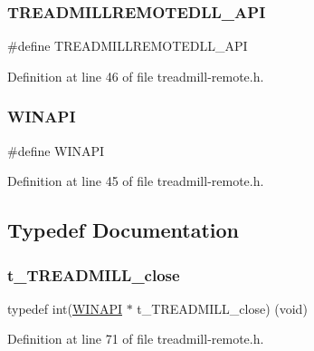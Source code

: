 \subsubsection{\texorpdfstring{T\+R\+E\+A\+D\+M\+I\+L\+L\+R\+E\+M\+O\+T\+E\+D\+L\+L\+\_\+\+A\+PI}{TREADMILLREMOTEDLL\_API}}
{\footnotesize\ttfamily \#define T\+R\+E\+A\+D\+M\+I\+L\+L\+R\+E\+M\+O\+T\+E\+D\+L\+L\+\_\+\+A\+PI}



Definition at line 46 of file treadmill-\/remote.\+h.

\mbox{\label{treadmill-remote_8h_a9aa60e1ead64be77ad551e745cbfd4d3}} 
\subsubsection{\texorpdfstring{W\+I\+N\+A\+PI}{WINAPI}}
{\footnotesize\ttfamily \#define W\+I\+N\+A\+PI}



Definition at line 45 of file treadmill-\/remote.\+h.



\subsection{Typedef Documentation}
\mbox{\label{treadmill-remote_8h_a43fd64b472e18efee7fddae738cf3b3c}} 
\subsubsection{\texorpdfstring{t\+\_\+\+T\+R\+E\+A\+D\+M\+I\+L\+L\+\_\+close}{t\_TREADMILL\_close}}
{\footnotesize\ttfamily typedef int(\hyperlink{treadmill-remote_8h_a9aa60e1ead64be77ad551e745cbfd4d3}{W\+I\+N\+A\+PI} $\ast$ t\+\_\+\+T\+R\+E\+A\+D\+M\+I\+L\+L\+\_\+close) (void)}



Definition at line 71 of file treadmill-\/remote.\+h.

